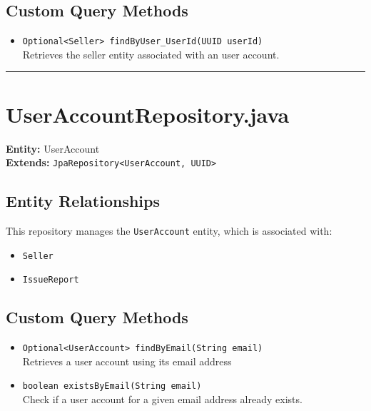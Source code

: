 \documentclass[12pt]{article}
\begin{document}
\subsection*{Custom Query Methods}
\begin{itemize}
    \item \texttt{Optional<Seller> findByUser\_UserId(UUID userId)} \\
    Retrieves the seller entity associated with an user account.

\end{itemize}

\hrule
\vspace{1em}

\section{UserAccountRepository.java}

\textbf{Entity:} UserAccount \\
\textbf{Extends:} \texttt{JpaRepository<UserAccount, UUID>}

\subsection*{Entity Relationships}

This repository manages the \texttt{UserAccount} entity, which is associated with:

\begin{itemize}
    \item \texttt{Seller}
    \item \texttt{IssueReport}
\end{itemize}


\subsection*{Custom Query Methods}
\begin{itemize}
    \item \texttt{Optional<UserAccount> findByEmail(String email)} \\
    Retrieves a user account using its email address


    \item \texttt{boolean existsByEmail(String email)} \\
    Check if a user account for a given email address already exists.


\end{itemize}
\end{document}

